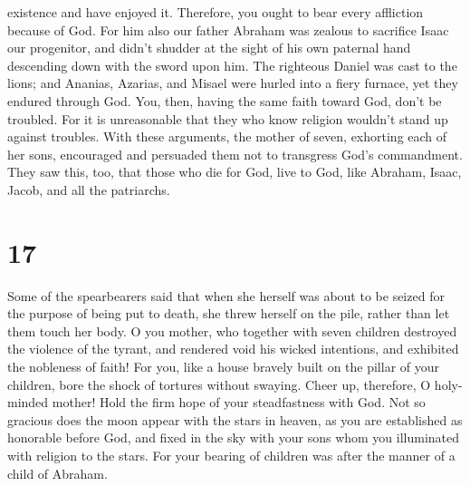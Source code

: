 existence and have enjoyed it.  Therefore, you ought to
bear every affliction because of God.  For him also our
father Abraham was zealous to sacrifice Isaac our progenitor, and didn't
shudder at the sight of his own paternal hand descending down with the
sword upon him.  The righteous Daniel was cast to the
lions; and Ananias, Azarias, and Misael were hurled into a fiery
furnace, yet they endured through God.  You, then, having
the same faith toward God, don't be troubled.  For it is
unreasonable that they who know religion wouldn't stand up against
troubles.  With these arguments, the mother of seven,
exhorting each of her sons, encouraged and persuaded them not to
transgress God's commandment.  They saw this, too, that
those who die for God, live to God, like Abraham, Isaac, Jacob, and all
the patriarchs.

\hypertarget{section-16}{%
\section{17}\label{section-16}}

 Some of the spearbearers said that when she herself was
about to be seized for the purpose of being put to death, she threw
herself on the pile, rather than let them touch her body.  O
you mother, who together with seven children destroyed the violence of
the tyrant, and rendered void his wicked intentions, and exhibited the
nobleness of faith!  For you, like a house bravely built on
the pillar of your children, bore the shock of tortures without swaying.
 Cheer up, therefore, O holy-minded mother! Hold the firm
hope of your steadfastness with God.  Not so gracious does
the moon appear with the stars in heaven, as you are established as
honorable before God, and fixed in the sky with your sons whom you
illuminated with religion to the stars.  For your bearing of
children was after the manner of a child of Abraham.

